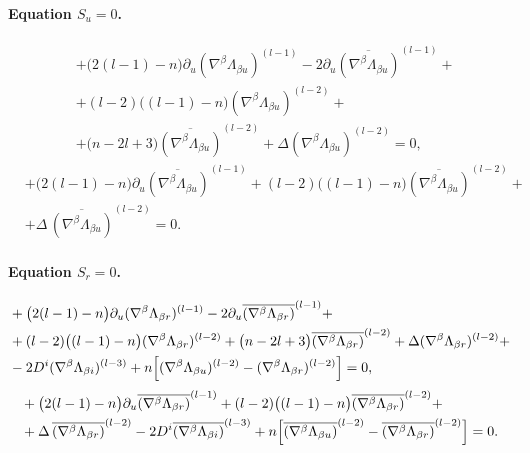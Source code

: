 \documentclass[a4paper,12pt]{article}
\begin{document}
\paragraph{Equation $S_u=0$.}
\begin{align}
&+\bigl(2(l-1)-n\bigr)\partial_u(\nabla^\beta\Lambda_{\beta u})^{(l-1)}
-2\partial_u\overline{(\nabla^\beta\Lambda_{\beta u})}^{(l-1)}+\\
&
+(l-2)\bigl((l-1)-n\bigr)(\nabla^\beta\Lambda_{\beta u})^{(l-2)}+\\
&
+\bigl(n-2l+3\bigr)\overline{(\nabla^\beta\Lambda_{\beta u})}^{(l-2)}
+\Delta(\nabla^\beta\Lambda_{\beta u})^{(l-2)} =0,
\end{align}
\begin{align}
&+\bigl(2(l-1)-n\bigr)\partial_u\overline{(\nabla^\beta\Lambda_{\beta u})}^{(l-1)}
+(l-2)\bigl((l-1)-n\bigr)\overline{(\nabla^\beta\Lambda_{\beta u})}^{(l-2)}+
\nonumber\\
&
+\Delta\,\overline{(\nabla^\beta\Lambda_{\beta u})}^{(l-2)}=0 .
\end{align}

\paragraph{Equation $S_r=0$.}
\begin{align}
&+\bigl(2(l-1)-n\bigr)\partial_u(\nabla^\beta\Lambda_{\beta r})^{(l-1)}
-2\partial_u\overline{(\nabla^\beta\Lambda_{\beta r})}^{(l-1)}+
\nonumber\\
&
+(l-2)\bigl((l-1)-n\bigr)(\nabla^\beta\Lambda_{\beta r})^{(l-2)}
+\bigl(n-2l+3\bigr)\overline{(\nabla^\beta\Lambda_{\beta r})}^{(l-2)}
+\Delta(\nabla^\beta\Lambda_{\beta r})^{(l-2)}+
\nonumber\\
&
-2 D^i(\nabla^\beta\Lambda_{\beta i})^{(l-3)}
+n\Bigl[(\nabla^\beta\Lambda_{\beta u})^{(l-2)}
-(\nabla^\beta\Lambda_{\beta r})^{(l-2)}\Bigr]=0 ,
\end{align}
\begin{align}
&+\bigl(2(l-1)-n\bigr)\partial_u\overline{(\nabla^\beta\Lambda_{\beta r})}^{(l-1)}
+(l-2)\bigl((l-1)-n\bigr)\overline{(\nabla^\beta\Lambda_{\beta r})}^{(l-2)}+
\nonumber\\
&
+\Delta\,\overline{(\nabla^\beta\Lambda_{\beta r})}^{(l-2)}
-2 D^i\overline{(\nabla^\beta\Lambda_{\beta i})}^{(l-3)}
+n\Bigl[\overline{(\nabla^\beta\Lambda_{\beta u})}^{(l-2)}
-\overline{(\nabla^\beta\Lambda_{\beta r})}^{(l-2)}\Bigr]=0.
\end{align}
\end{document}
